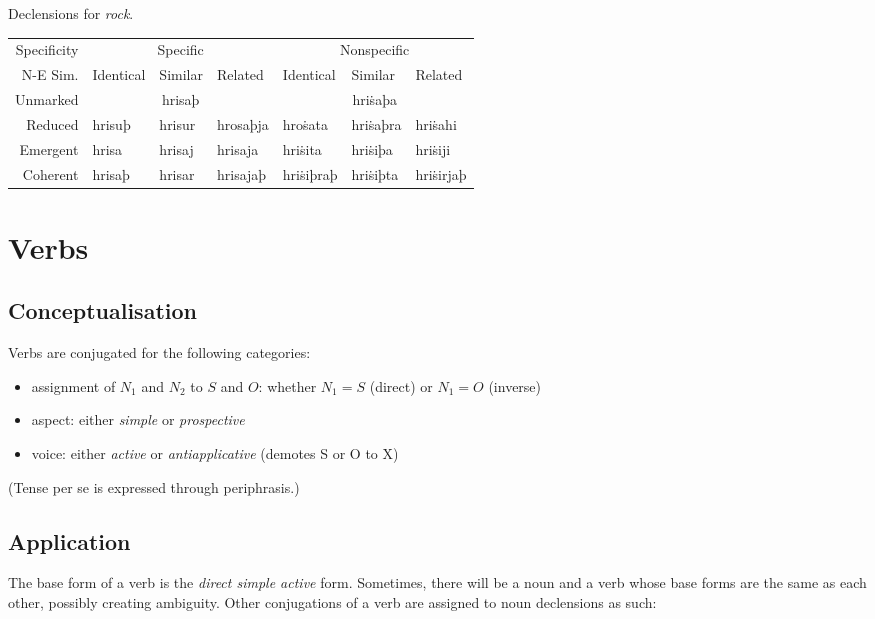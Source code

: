 \documentclass{book}
\begin{document}
\begin{tablenf}
  \caption{Declensions for  \emph{rock}. \label{table:declensionex1}}
  \centering
  \begin{tabular}{r|lll|lll}
    Specificity & \multicolumn{3}{c|}{Specific} & \multicolumn{3}{c}{Nonspecific} \\
    N-E \bs{} Sim. & Identical & Similar & Related & Identical & Similar & Related \\
    \hline
    Unmarked & \multicolumn{3}{c|}{hrisaþ} & \multicolumn{3}{c}{hriṡaþa} \\
    Reduced & hrisuþ & hrisur & hrosaþja & hroṡata & hriṡaþra & hriṡahi \\
    Emergent & hrisa & hrisaj & hrisaja & hriṡita & hriṡiþa & hriṡiji \\
    Coherent & hrisaþ & hrisar & hrisajaþ & hriṡiþraþ & hriṡiþta & hriṡirjaþ \\
  \end{tabular}
\end{tablenf}

\chapter{Verbs}

\section{Conceptualisation}

Verbs are conjugated for the following categories:

\begin{itemize}
  \item assignment of $N_1$ and $N_2$ to $S$ and $O$: whether $N_1 = S$ (direct) or $N_1 = O$ (inverse)
  \item aspect: either \emph{simple} or \emph{prospective}
  \item voice: either \emph{active} or \emph{antiapplicative} (demotes S or O to X)
\end{itemize}

(Tense per se is expressed through periphrasis.)

\section{Application}

The base form of a verb is the \emph{direct simple active} form. Sometimes, there will be a noun and a verb whose base forms are the same as each other, possibly creating ambiguity. Other conjugations of a verb are assigned to noun declensions as such:
\end{document}
